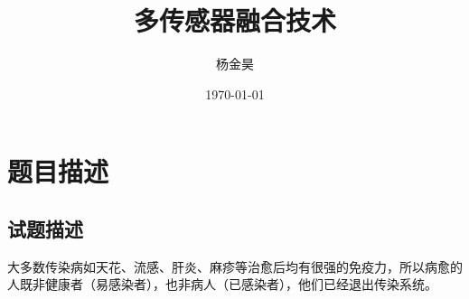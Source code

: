 \documentclass[supercite]{HustGraduPaper}
\title{多传感器融合技术}
\author{杨金昊} %
\date{\today} %
\begin{document}
	\maketitle[logo color= black]

	\clearpage %

	\tableofcontents
	
	\clearpage%

	\section{题目描述}
	\subsection{试题描述}
		大多数传染病如天花、流感、肝炎、麻疹等治愈后均有很强的免疫力，所以病愈的人既非健康者（易感染者），也非病人（已感染者），他们已经退出传染系统。
\end{document}

